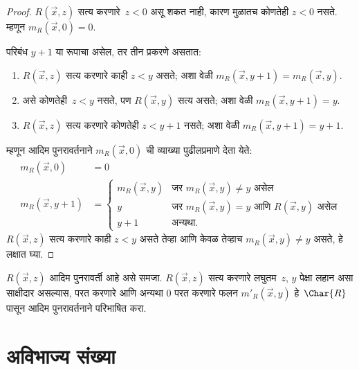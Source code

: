 \begin{proof}
$R(\vec{x}, z)$ सत्य करणारे~$z < 0$ असू शकत नाही, कारण मुळातच कोणतेही
$z < 0$ नसते. म्हणून $m_R(\vec x, 0) = 0$.

परिबंध $y + 1$ या रूपाचा असेल, तर तीन प्रकरणे असतात:
\begin{enumerate}
\item $R(\vec{x}, z)$ सत्य करणारे काही $z < y$ असते; अशा वेळी
$m_R(\vec{x}, y+1) = m_R(\vec{x}, y)$.
\item असे कोणतेही~$z<y$ नसते, पण $R(\vec{x}, y)$ सत्य असते; अशा वेळी
$m_R(\vec{x}, y+1) = y$.
\item $R(\vec{x}, z)$ सत्य करणारे कोणतेही $z < y+1$ नसते; अशा वेळी
$m_R(\vec{x}, y+1) = y+1$.
\end{enumerate}
म्हणून आदिम पुनरावर्तनाने $m_R(\vec x, 0)$ ची व्याख्या पुढीलप्रमाणे
देता येते:
\begin{align*}
m_R(\vec{x}, 0) & = 0\\
m_R(\vec{x}, y+1) & =
\begin{cases}
m_R(\vec{x}, y) & \text{जर $m_R(\vec x, y) \neq y$ असेल}\\
y & \text{जर $m_R(\vec x, y) = y$ आणि $R(\vec{x}, y)$ असेल}\\
y+1 & \text{अन्यथा.}
\end{cases}
\end{align*}
$R(\vec x, z)$ सत्य करणारे काही $z<y$ असते तेव्हा आणि केवळ तेव्हाच
$m_R(\vec x, y) \neq y$ असते, हे लक्षात घ्या.
\end{proof}

\begin{prob}
$R(\vec x, z)$ आदिम पुनरावर्ती आहे असे समजा. $R(\vec{x}, z)$ सत्य
करणारे लघुतम~$z$, $y$ पेक्षा लहान असा साक्षीदार असल्यास, परत करणारे आणि
अन्यथा $0$ परत करणारे फलन $m'_R(\vec{x}, y)$ हे~$\Char{R}$ पासून
आदिम पुनरावर्तनाने परिभाषित करा.
\end{prob}











\section{अविभाज्य संख्या}\label{cmp:rec:pri:sec}

